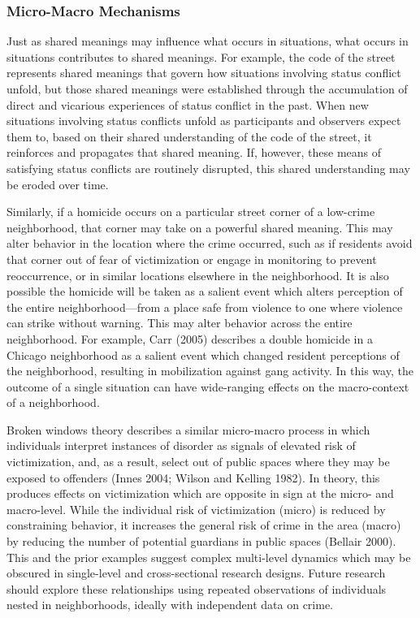 \documentclass [11pt, proquest] {uwthesis}[2015/03/03]
\begin{document}
\hypertarget{micro-macro-mechanisms}{%
\subsubsection{Micro-Macro Mechanisms}\label{micro-macro-mechanisms}}

Just as shared meanings may influence what occurs in situations, what occurs in situations contributes to shared meanings. For example, the code of the street represents shared meanings that govern how situations involving status conflict unfold, but those shared meanings were established through the accumulation of direct and vicarious experiences of status conflict in the past. When new situations involving status conflicts unfold as participants and observers expect them to, based on their shared understanding of the code of the street, it reinforces and propagates that shared meaning. If, however, these means of satisfying status conflicts are routinely disrupted, this shared understanding may be eroded over time.

Similarly, if a homicide occurs on a particular street corner of a low-crime neighborhood, that corner may take on a powerful shared meaning. This may alter behavior in the location where the crime occurred, such as if residents avoid that corner out of fear of victimization or engage in monitoring to prevent reoccurrence, or in similar locations elsewhere in the neighborhood. It is also possible the homicide will be taken as a salient event which alters perception of the entire neighborhood---from a place safe from violence to one where violence can strike without warning. This may alter behavior across the entire neighborhood. For example, Carr (2005) describes a double homicide in a Chicago neighborhood as a salient event which changed resident perceptions of the neighborhood, resulting in mobilization against gang activity. In this way, the outcome of a single situation can have wide-ranging effects on the macro-context of a neighborhood.

Broken windows theory describes a similar micro-macro process in which individuals interpret instances of disorder as signals of elevated risk of victimization, and, as a result, select out of public spaces where they may be exposed to offenders (Innes 2004; Wilson and Kelling 1982). In theory, this produces effects on victimization which are opposite in sign at the micro- and macro-level. While the individual risk of victimization (micro) is reduced by constraining behavior, it increases the general risk of crime in the area (macro) by reducing the number of potential guardians in public spaces (Bellair 2000). This and the prior examples suggest complex multi-level dynamics which may be obscured in single-level and cross-sectional research designs. Future research should explore these relationships using repeated observations of individuals nested in neighborhoods, ideally with independent data on crime.
\end{document}
